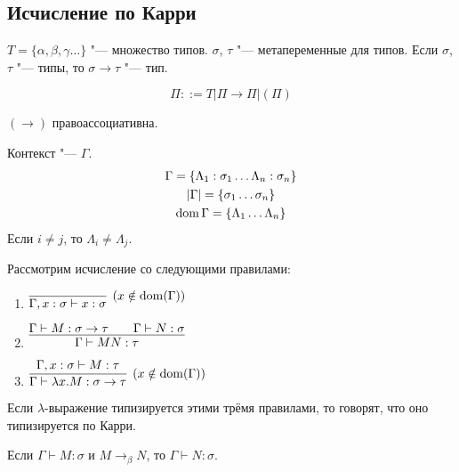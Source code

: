 \subsection{\texorpdfstring{Исчисление по Карри}{Curry-style}}

\begin{definition}[тип]
    $T = \{\alpha, \beta, \gamma \ldots\}$ "--- множество типов.
    $\sigma$, $\tau$ "--- метапеременные для типов.
    Если $\sigma$, $\tau$ "--- типы, то $\sigma \to \tau$ "--- тип.
    \begin{bnf}
    \[
        \Pi ::= T | \Pi \to \Pi | (\Pi)
    \]
    \end{bnf}
    $\left(\to\right)$ правоассоциативна.
\end{definition}

\begin{definition}[контекст] Контекст "--- $\Gamma$.
\begin{gather*}
    \Gamma = \{ \Lambda_{1} : \sigma_{1} \ldots \Lambda_{n} : \sigma_{n} \} \\
    \left|\Gamma\right| = \{ \sigma_{1} \ldots \sigma_{n} \} \\
    \operatorname{dom} \Gamma = \{ \Lambda_{1} \ldots \Lambda_{n} \}
\end{gather*}
Если $i \neq j$, то $\Lambda_i \neq \Lambda_j$.
\end{definition}

\begin{definition}
    Рассмотрим исчисление со следующими правилами:
    \begin{enumerate}
        \item $\infer[(x \notin \dom(\Gamma))]
            {\Gamma, x:\sigma \vdash x:\sigma}
            {}$
        \item $\infer[]
            {\Gamma \vdash M N : \tau}
            {\Gamma \vdash M:\sigma \to \tau && \Gamma \vdash N:\sigma}$
        \item $\infer[(x \notin \dom(\Gamma))]
            {\Gamma \vdash \lambda x . M : \sigma \to \tau}
            {\Gamma, x : \sigma \vdash M : \tau}$
    \end{enumerate}
    Если $\lambda$-выражение типизируется этими трёмя правилами, то говорят, что оно типизируется по Карри.
\end{definition}

\begin{lemma}
    Если $\Gamma \vdash M : \sigma$ и $M \to_{\beta}N$, то $\Gamma \vdash N : \sigma$.
\end{lemma}

